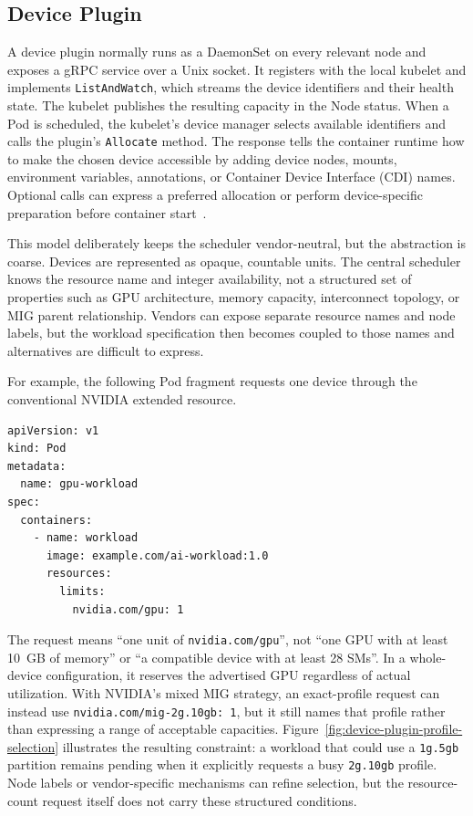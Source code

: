 \subsection{Device Plugin}

A device plugin normally runs as a DaemonSet on every relevant node and exposes a gRPC service over a Unix socket. It registers with the local kubelet and implements \texttt{ListAndWatch}, which streams the device identifiers and their health state. The kubelet publishes the resulting capacity in the Node status. When a Pod is scheduled, the kubelet's device manager selects available identifiers and calls the plugin's \texttt{Allocate} method. The response tells the container runtime how to make the chosen device accessible by adding device nodes, mounts, environment variables, annotations, or Container Device Interface (CDI) names. Optional calls can express a preferred allocation or perform device-specific preparation before container start~\cite{kubernetes135deviceplugins}.

This model deliberately keeps the scheduler vendor-neutral, but the abstraction is coarse. Devices are represented as opaque, countable units. The central scheduler knows the resource name and integer availability, not a structured set of properties such as GPU architecture, memory capacity, interconnect topology, or MIG parent relationship. Vendors can expose separate resource names and node labels, but the workload specification then becomes coupled to those names and alternatives are difficult to express.

For example, the following Pod fragment requests one device through the conventional NVIDIA extended resource.

\begin{lstlisting}[language={},basicstyle=\ttfamily\footnotesize,numbers=none,caption={Device-plugin request for one advertised GPU.},label={lst:device-plugin-request}]
apiVersion: v1
kind: Pod
metadata:
  name: gpu-workload
spec:
  containers:
    - name: workload
      image: example.com/ai-workload:1.0
      resources:
        limits:
          nvidia.com/gpu: 1
\end{lstlisting}

The request means \enquote{one unit of \texttt{nvidia.com/gpu}}, not \enquote{one GPU with at least 10~GB of memory} or \enquote{a compatible device with at least 28 SMs}. In a whole-device configuration, it reserves the advertised GPU regardless of actual utilization. With NVIDIA's mixed MIG strategy, an exact-profile request can instead use \texttt{nvidia.com/mig-2g.10gb: 1}, but it still names that profile rather than expressing a range of acceptable capacities. Figure~\ref{fig:device-plugin-profile-selection} illustrates the resulting constraint: a workload that could use a \texttt{1g.5gb} partition remains pending when it explicitly requests a busy \texttt{2g.10gb} profile. Node labels or vendor-specific mechanisms can refine selection, but the resource-count request itself does not carry these structured conditions.

